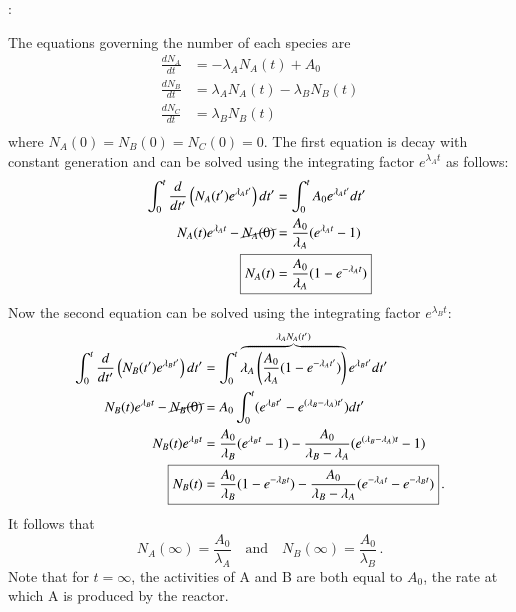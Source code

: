 \vspace{0.5cm}
\ifsolved
{
\color{purple}

:

The equations governing the number of each species are
\begin{equation*}
\begin{split}
 \frac{dN_A}{dt} &= -\lambda_A N_A(t) + A_0 \\
 \frac{dN_B}{dt} &= \lambda_A N_A(t) - \lambda_B N_B(t) \\
 \frac{dN_C}{dt} &= \lambda_B N_B(t) \\
\end{split}
\end{equation*}
where $N_A(0) = N_B(0) = N_C(0) = 0$.  The first equation is decay with constant generation and can be solved using the integrating factor $e^{\lambda_A t}$ as follows:
\begin{align*}
  \int^{t}_0 \frac{d}{dt'} \left ( N_A(t') e^{\lambda_A t'} \right ) dt'
     &= \int^{t}_0 A_0 e^{\lambda_A t'} dt' \\
  N_A(t) e^{\lambda_A t} - \cancel{N_A(0)}
     &= \frac{A_0}{\lambda_A} ( e^{\lambda_A t} - 1) \\
     \Aboxed{ N_A(t) &= \frac{A_0}{\lambda_A} ( 1 - e^{-\lambda_A t} )}
\end{align*}
Now the second equation can be solved using the integrating factor $e^{\lambda_B t}$:
\begin{align*}
  \int^{t}_0 \frac{d}{dt'} \left ( N_B(t') e^{\lambda_B t'} \right ) dt'
     &= \int^{t}_0  \overbrace{\lambda_A \left(\frac{A_0}{\lambda_A} ( 1 - e^{-\lambda_A t'} )\right )}^{\lambda_A N_A(t')} e^{\lambda_B t'} dt' \\
  N_B(t) e^{\lambda_B t} - \cancel{N_B(0)}
     &= A_0 \int^{t}_0  (  e^{\lambda_B t'} - e^{(\lambda_B-\lambda_A) t'} ) dt' \\
     N_B(t) e^{\lambda_B t} &= \frac{A_0}{\lambda_B} (e^{\lambda_B t}-1) - \frac{A_0}{\lambda_B-\lambda_A}(e^{(\lambda_B-\lambda_A)t}-1) \\
    \Aboxed{ N_B(t) &=  \frac{A_0}{\lambda_B} (1 - e^{-\lambda_B t}) -
                 \frac{A_0}{\lambda_B-\lambda_A}(e^{-\lambda_A t}-e^{-\lambda_B t}) } \, .
\end{align*}
It follows that
\begin{equation*}
 \boxed{N_A(\infty) = \frac{A_0}{\lambda_A} \quad \text{and} \quad N_B(\infty) = \frac{A_0}{\lambda_B}} \, .
\end{equation*}
Note that for $t=\infty$, the activities of A and B are both equal to $A_0$, the rate at which A is produced by the reactor.

} %
\newpage
\else
\fi
